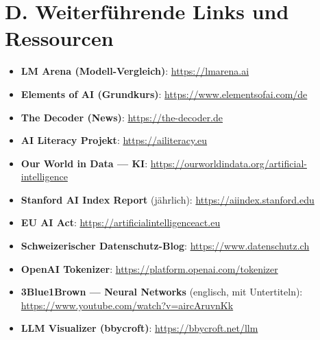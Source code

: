 \section*{D. Weiterführende Links und Ressourcen}

\begin{itemize}
    \item \textbf{LM Arena (Modell-Vergleich)}: \url{https://lmarena.ai}
    \item \textbf{Elements of AI (Grundkurs)}: \url{https://www.elementsofai.com/de}
    \item \textbf{The Decoder (News)}: \url{https://the-decoder.de}
    \item \textbf{AI Literacy Projekt}: \url{https://ailiteracy.eu}
    \item \textbf{Our World in Data --- KI}: \url{https://ourworldindata.org/artificial-intelligence}
    \item \textbf{Stanford AI Index Report} (jährlich):
          \url{https://aiindex.stanford.edu}
    \item \textbf{EU AI Act}: \url{https://artificialintelligenceact.eu}
    \item \textbf{Schweizerischer Datenschutz-Blog}: \url{https://www.datenschutz.ch}
    \item \textbf{OpenAI Tokenizer}: \url{https://platform.openai.com/tokenizer}
    \item \textbf{3Blue1Brown --- Neural Networks} (englisch, mit Untertiteln):
          \url{https://www.youtube.com/watch?v=aircAruvnKk}
    \item \textbf{LLM Visualizer (bbycroft)}: \url{https://bbycroft.net/llm}
\end{itemize}
